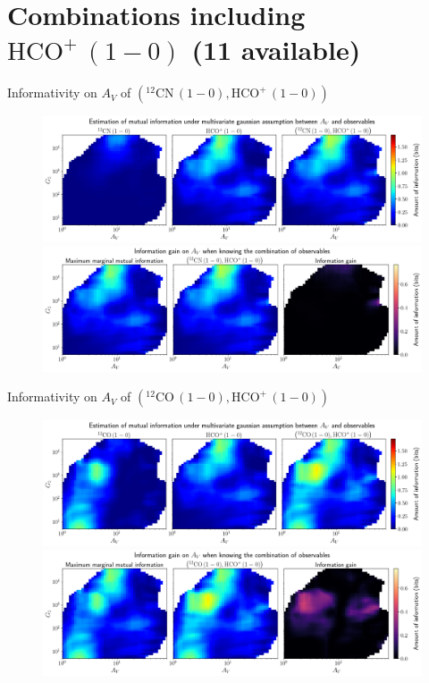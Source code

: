 \documentclass{beamer}
\begin{document}
\section{Combinations including $\mathrm{HCO^+\,(1-0)}$ (11 available)}

\begin{frame}{Informativity on $A_V$ of $\left(\mathrm{^{12}CN\,(1-0)},\mathrm{HCO^+\,(1-0)}\right)$}
    \begin{figure}
        \centering
        \includegraphics[width=0.95\linewidth]{../linearinfo/av__12cn10_hcop10_linearinfo.png}
        \vfill
        \includegraphics[width=0.95\linewidth]{../linearinfo/av__12cn10_hcop10_linearinfo_gain.png}
    \end{figure}
\end{frame}

\begin{frame}{Informativity on $A_V$ of $\left(\mathrm{^{12}CO\,(1-0)},\mathrm{HCO^+\,(1-0)}\right)$}
    \begin{figure}
        \centering
        \includegraphics[width=0.95\linewidth]{../linearinfo/av__12co10_hcop10_linearinfo.png}
        \vfill
        \includegraphics[width=0.95\linewidth]{../linearinfo/av__12co10_hcop10_linearinfo_gain.png}
    \end{figure}
\end{frame}
\end{document}
